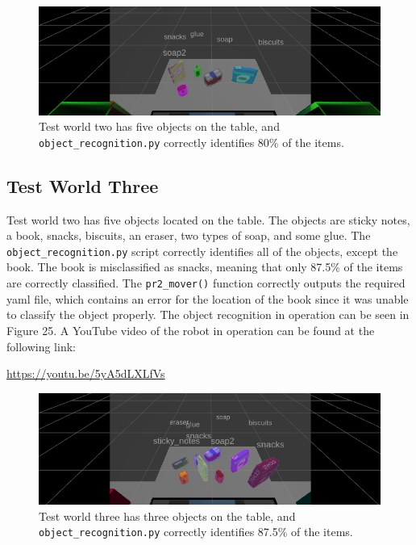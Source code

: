 \documentclass[a4paper]{article}
\begin{document}
\begin{figure}[h]
	\centering
	\includegraphics[scale=0.6]{test_case_2}
	\caption{Test world two has five objects on the table, and \texttt{object\_recognition.py} correctly identifies 80\% of the items.}
\end{figure}

\newpage
\subsection{Test World Three}
Test world two has five objects located on the table. The objects are sticky notes, a book, snacks, biscuits, an eraser, two types of soap, and some glue. The \verb|object_recognition.py| script correctly identifies all of the objects, except the book. The book is misclassified as snacks, meaning that only 87.5\% of the items are correctly classified. The \verb|pr2_mover()| function correctly outputs the required yaml file, which contains an error for the location of the book since it was unable to classify the object properly. The object recognition in operation can be seen in Figure 25. A YouTube video of the robot in operation can be found at the following link:
\begin{center}
	\url{https://youtu.be/5yA5dLXLfVs}
\end{center}

\begin{figure}[h]
	\centering
	\includegraphics[scale=0.6]{test_case_3}
	\caption{Test world three has three objects on the table, and \texttt{object\_recognition.py} correctly identifies 87.5\% of the items.}
\end{figure}
\end{document}
